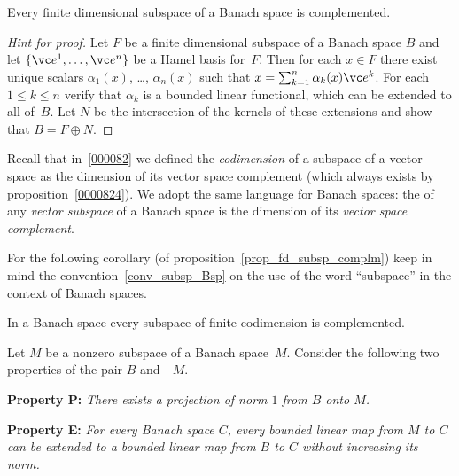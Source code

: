 \begin{prop}\label{prop_fd_subsp_complm} Every finite dimensional subspace of a Banach space is complemented.
\end{prop}

\begin{proof}[\emph{Hint for proof}] Let $F$ be a finite dimensional subspace of a Banach space $B$ and let
$\{\vc e^1, \dots, \vc e^n\}$ be a Hamel basis for~$F$.  Then for each $x \in F$ there exist unique scalars
$\alpha_1(x)$, \dots , $\alpha_n(x)$ such that $x = \sum_{k=1}^n \alpha_k(x)\vc e^k$. For each $1 \le k \le n$
verify that $\alpha_k$ is a bounded linear functional, which can be extended to all of~$B$.  Let $N$ be the
intersection of the kernels of these extensions and show that $B = F \oplus N$.  \ns
\end{proof}

\begin{defn} Recall that in~\ref{000082} we defined the \emph{codimension} of a subspace of a vector space
as the dimension of its vector space complement (which always exists by proposition~\ref{0000824}).  We adopt
the same language for Banach spaces: the
 of any \emph{vector subspace} of a Banach space is the dimension of its \emph{vector space
complement}.
\end{defn}

For the following corollary (of proposition~\ref{prop_fd_subsp_complm}) keep in mind the
convention~\ref{conv_subsp_Bsp} on the use of the word ``subspace'' in the context of Banach spaces.

\begin{cor} In a Banach space every subspace of finite codimension is complemented.
\end{cor}




















Let $M$ be a nonzero subspace of a Banach space~$M$.  Consider the following two properties of the pair $B$ and~~$M$.

\textbf{Property P:} \emph{There exists a projection of norm $1$ from $B$ onto $M$.}

\textbf{Property E:} \emph{For every Banach space $C$, every bounded linear map from $M$ to $C$ can be extended to a bounded
linear map from $B$ to $C$ without increasing its norm.}

